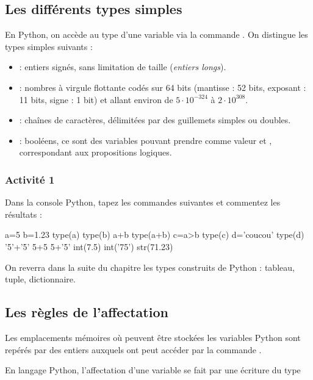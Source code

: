 \documentclass[11pt,a4paper,french,twoside]{PMCours}
\begin{document}
\subsection{Les différents types simples}
En Python, on accède au type d'une variable via la commande . On 
distingue les types simples suivants :
\begin{itemize}
\item {} : entiers signés, sans limitation de taille (\emph{entiers longs}).
\item {} : nombres à virgule flottante codés sur 64 bits (mantisse : 52 bits,
exposant : 11 bits, signe : 1 bit) et allant environ de $5\cdot10^{-324}$ à $2\cdot 10^{308}$.
\item {} : chaînes de caractères, délimitées par des guillemets simples 
ou doubles.
\item {} : booléens, ce sont des variables pouvant prendre comme valeur 
 et , correspondant aux propositions logiques. 
\end{itemize}
\subsubsection*{Activité 1}
Dans la console Python, tapez les commandes suivantes et commentez les résultats :
\begin{Python}
a=5
b=1.23
type(a)
type(b)
a+b
type(a+b)
c=a>b
type(c)
d='coucou'
type(d)
'5'+'5'
5+5
5+'5'
int(7.5)
int('75')
str(71.23)
\end{Python}
On reverra dans la suite du chapitre les types construits de Python : tableau, 
tuple, dictionnaire. 
\subsection{Les règles de l'affectation}
Les emplacements mémoires où peuvent être stockées les variables Python sont 
repérés par des entiers auxquels ont peut accéder par la commande .

En langage Python, l'affectation d'une variable se fait par une écriture du type

\smallskip
\centerline{}
\end{document}
